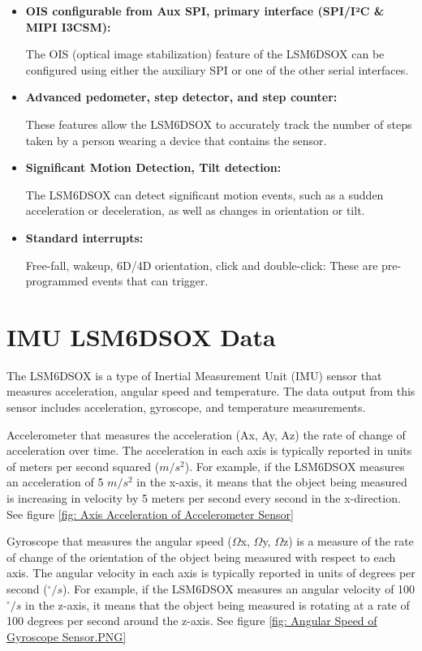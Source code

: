 \begin{itemize}
\item  \textbf{OIS configurable from Aux SPI, primary interface (SPI/I²C \& MIPI I3CSM): }
 
 The OIS (optical image stabilization) feature of the LSM6DSOX can be configured using either the auxiliary SPI or one of the other serial interfaces.

\item  \textbf{Advanced pedometer, step detector, and step counter: }
 
 These features allow the LSM6DSOX to accurately track the number of steps taken by a person wearing a device that contains the sensor.

\item  \textbf{Significant Motion Detection, Tilt detection: }
 
 The LSM6DSOX can detect significant motion events, such as a sudden acceleration or deceleration, as well as changes in orientation or tilt.

\item  \textbf{Standard interrupts:}
 
 Free-fall, wakeup, 6D/4D orientation, click and double-click: These are pre-programmed events that can trigger.
 
\end{itemize}

\section{IMU LSM6DSOX Data}

The LSM6DSOX is a type of Inertial Measurement Unit (IMU) sensor that measures acceleration, angular speed and temperature. The data output from this sensor includes acceleration, gyroscope, and temperature measurements.

\bigskip

 Accelerometer that measures the acceleration (Ax, Ay, Az) the rate of change of acceleration over time. The acceleration in each axis is typically reported in units of meters per second squared ($m/s^2$). For example, if the LSM6DSOX measures an acceleration of 5 $m/s^2$ in the x-axis, it means that the object being measured is increasing in velocity by 5 meters per second every second in the x-direction. See figure \ref{fig: Axis Acceleration of Accelerometer Sensor}

\bigskip

 Gyroscope that measures the angular speed ($\Omega$x, $\Omega$y, $\Omega$z) is a measure of the rate of change of the orientation of the object being measured with respect to each axis. The angular velocity in each axis is typically reported in units of degrees per second ($^\circ/s$). For example, if the LSM6DSOX measures an angular velocity of 100$^\circ/s$ in the z-axis, it means that the object being measured is rotating at a rate of 100 degrees per second around the z-axis. See figure \ref{fig: Angular Speed of Gyroscope Sensor.PNG}

